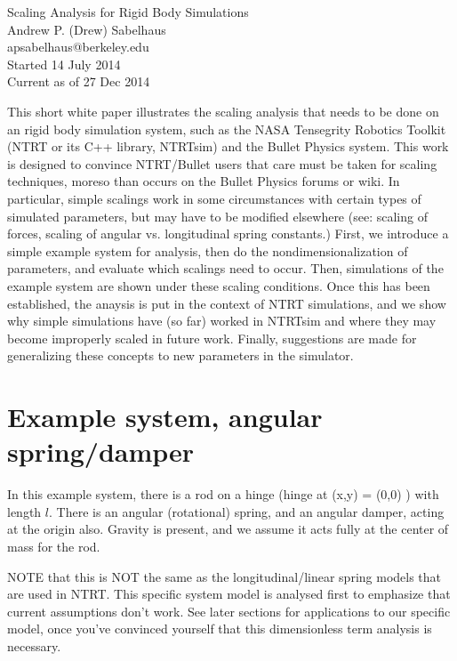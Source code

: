 \documentclass[12pt,letterpaper]{article}
\begin{document}

\begin{center}
\huge
Scaling Analysis for Rigid Body Simulations\\
\normalsize
\vspace{0.1in}
Andrew P. (Drew) Sabelhaus\\
apsabelhaus@berkeley.edu \\
Started 14 July 2014 \\
Current as of 27 Dec 2014
\end{center}


This short white paper illustrates the scaling analysis that needs to be done on an rigid body simulation system, such as the NASA Tensegrity Robotics Toolkit (NTRT or its C++ library, NTRTsim) and the Bullet Physics system.
This work is designed to convince NTRT/Bullet users that care must be taken for scaling techniques, moreso than occurs on the Bullet Physics forums or wiki.
In particular, simple scalings work in some circumstances with certain types of simulated parameters, but may have to be modified elsewhere (see: scaling of forces, scaling of angular vs. longitudinal spring constants.)
First, we introduce a simple example system for analysis, then do the nondimensionalization of parameters, and evaluate which scalings need to occur.
Then, simulations of the example system are shown under these scaling conditions.
Once this has been established, the anaysis is put in the context of NTRT simulations, and we show why simple simulations have (so far) worked in NTRTsim and where they may become improperly scaled in future work.
Finally, suggestions are made for generalizing these concepts to new parameters in the simulator.

\section{Example system, angular spring/damper}

In this example system, there is a rod on a hinge (hinge at (x,y) = (0,0) ) with length $l$.
There is an angular (rotational) spring, and an angular damper, acting at the origin also.
Gravity is present, and we assume it acts fully at the center of mass for the rod.

NOTE that this is NOT the same as the longitudinal/linear spring models that are used in NTRT.
This specific system model is analysed first to emphasize that current assumptions don't work.
See later sections for applications to our specific model, once you've convinced yourself that this dimensionless term analysis is necessary.
\end{document}
